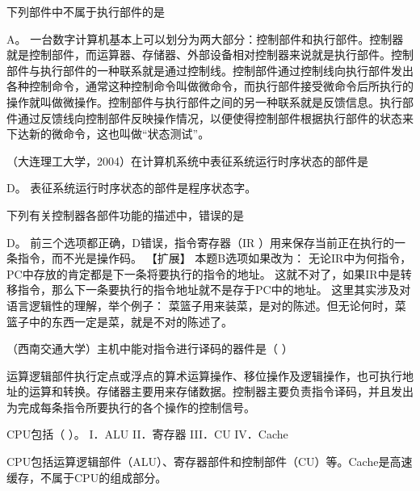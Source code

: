 \question 下列部件中不属于执行部件的是
\par{}
\begin{solution}A。
一台数字计算机基本上可以划分为两大部分：控制部件和执行部件。控制器就是控制部件，而运算器、存储器、外部设备相对控制器来说就是执行部件。控制部件与执行部件的一种联系就是通过控制线。控制部件通过控制线向执行部件发出各种控制命令，通常这种控制命令叫做微命令，而执行部件接受微命令后所执行的操作就叫做微操作。控制部件与执行部件之间的另一种联系就是反馈信息。执行部件通过反馈线向控制部件反映操作情况，以便使得控制部件根据执行部件的状态来下达新的微命令，这也叫做``状态测试''。
\end{solution}
\question （大连理工大学，2004）在计算机系统中表征系统运行时序状态的部件是
\par{}
\begin{solution}D。 表征系统运行时序状态的部件是程序状态字。
\end{solution}
\question 下列有关控制器各部件功能的描述中，错误的是
\par{}
\begin{solution}D。 前三个选项都正确，D错误，指令寄存器（IR
）用来保存当前正在执行的一条指令，而不光是操作码。 【扩展】
本题B选项如果改为：
无论IR中为何指令，PC中存放的肯定都是下一条将要执行的指令的地址。
这就不对了，如果IR中是转移指令，那么下一条要执行的指令地址就不是存于PC中的地址。
这里其实涉及对语言逻辑性的理解，举个例子：
菜篮子用来装菜，是对的陈述。但无论何时，菜篮子中的东西一定是菜，就是不对的陈述了。
\end{solution}
\question （西南交通大学）主机中能对指令进行译码的器件是（ ）
\par{}
\begin{solution}运算逻辑部件执行定点或浮点的算术运算操作、移位操作及逻辑操作，也可执行地址的运算和转换。存储器主要用来存储数据。控制器主要负责指令译码，并且发出为完成每条指令所要执行的各个操作的控制信号。
\end{solution}
\question CPU包括（ ）。 I．ALU II．寄存器 III．CU IV．Cache
\par{}
\begin{solution}CPU包括运算逻辑部件（ALU）、寄存器部件和控制部件（CU）等。Cache是高速缓存，不属于CPU的组成部分。
\end{solution}
